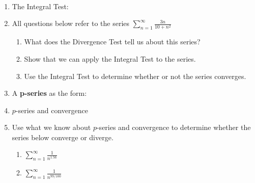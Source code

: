 \documentclass[11pt,fleqn]{article}
\begin{document}
\renewcommand{\headrulewidth}{0pt}
\newcommand{\blank}[1]{\rule{#1}{0.75pt}}
\newcommand{\bc}{\begin{center}}
\newcommand{\ec}{\end{center}}


\vspace*{-0.7in}

\begin{center}
  \large
  \\
   
\end{center}
\begin{enumerate}
\item The Integral Test:
\vfill
\item All questions below refer to the series $\displaystyle{\sum_{n=1}^\infty \frac{3n}{10+n^2}}$
	\begin{enumerate}
	\item What does the Divergence Test tell us about this series?
	\vspace{.7in}
	\item Show that we can apply the Integral Test to the series.
	\vspace{.7in}
	\item Use the Integral Test to determine whether or not the series converges.
	\vfill
	\end{enumerate}
\newpage
\item A \textbf{p-series} as the form: \\

\vfill
\item $p$-series and convergence

\vfill

\item Use what we know about $p$-series and convergence to determine whether the series below converge or diverge.
	\begin{enumerate}
	\item  $\displaystyle{\sum_{n=1}^\infty \frac{1}{n^{1.56}}}$
	\vspace{.5in}
	\item  $\displaystyle{\sum_{n=1}^\infty \frac{1}{n^{99/100}}}$
	\vspace{.5in}
	\end{enumerate}
\end{enumerate}
\end{document}
